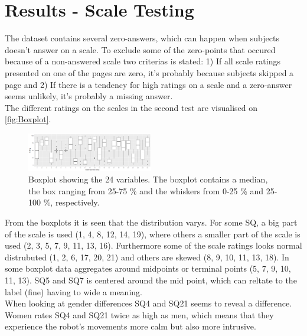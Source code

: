 \section{{\color{red}Results - Scale Testing}}
\label{ResultsScaleTesting}
%
The dataset contains several zero-answers, which can happen when subjects doesn't answer on a scale. To exclude some of the zero-points that occured because of a non-answered scale two criterias is stated: 1) If all scale ratings presented on one of the pages are zero, it's probably because subjects skipped a page and 2) If there is a tendency for high ratings on a scale and a zero-answer seems unlikely, it's probably a missing answer.\\

\noindent
The different ratings on the scales in the second test are visualised on \autoref{fig:Boxplot}.
%
\begin{figure}[H]
	\centering
	\includegraphics[width = 0.49\textwidth]{Figure/Boksplot24uden0}
	\setlength{} 
	\caption{Boxplot showing the 24 variables. The boxplot contains a median, the box ranging from 25-75 \% and the whiskers from 0-25 \% and 25-100 \%, respectively.}
	\label{fig:Boxplot}
\end{figure}
\noindent
%
From the boxplots it is seen that the distribution varys. For some SQ, a big part of the scale is used (1, 4, 8, 12, 14, 19), where others a smaller part of the scale is used (2, 3, 5, 7, 9, 11, 13, 16). Furthermore some of the scale ratings looks normal distrubuted (1, 2, 6, 17, 20, 21) and others are skewed (8, 9, 10, 11, 13, 18). In some boxplot data aggregates around midpoints or terminal points (5, 7, 9, 10, 11, 13). SQ5 and SQ7 is centered around the mid point, which can reltate to the label (fine) having to wide a meaning. \\ 

\noindent
When looking at gender differences SQ4 and SQ21 seems to reveal a difference. Women rates SQ4 and SQ21 twice as high as men, which means that they experience the robot's movements more calm but also more intrusive.\\

